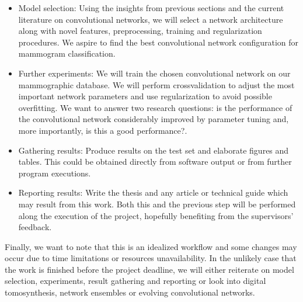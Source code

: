 \begin{itemize}
	\item Model selection: Using the insights from previous sections and the current literature on convolutional networks, we will select a network architecture along with novel features, preprocessing, training and regularization procedures. We aspire to find the best convolutional network configuration for mammogram classification.
	\item Further experiments: We will train the chosen convolutional network on our mammographic database. We will perform crossvalidation to adjust the most important network parameters and use regularization to avoid possible overfitting. We want to answer two research questions: is the performance of the convolutional network considerably improved by parameter tuning and, more importantly, is this a good performance?.
	\item Gathering results: Produce results on the test set and elaborate figures and tables. This could be obtained directly from software output or from further program executions.
	\item Reporting results: Write the thesis and any article or technical guide which may result from this work. Both this and the previous step will be performed along the execution of the project, hopefully benefiting from the supervisors' feedback.
\end{itemize}
Finally, we want to note that this is an idealized workflow and some changes may occur due to time limitations or resources unavailability. In the unlikely case that the work is finished before the project deadline, we will either reiterate on model selection, experiments, result gathering and reporting or look into digital tomosynthesis, network ensembles or evolving convolutional networks.

\begin{comment}
La {\it Metodología} (o lo que algunos autores llaman el {\it Método})
 es el proceso o
conjunto de pasos que debe efectuarse para llegar a cumplir con los
objetivos. Esos pasos deben contener  los experimentos a realizar, la forma de
llevarlos a cabo, la evaluación de los resultados, la prueba de las hipótesis,
la respuesta a las preguntas de investigación y el último paso debe ser el
reporte escrito de los resultados.
\end{comment}
